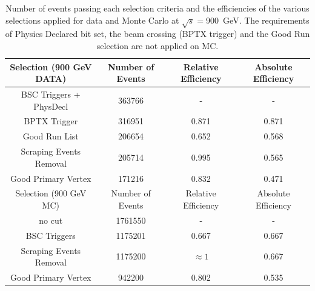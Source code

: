 \begin{table}[!ht]
  \begin{center}
    \begin{tabular}{|c|c|c|c|}
      \hline
      Selection (900 GeV DATA) & Number of Events  & Relative Efficiency & Absolute Efficiency\\
      \hline\hline
      BSC Triggers + PhysDecl  & 363766            & -                   & -      \\ 
      BPTX Trigger             & 316951		   & 0.871               & 0.871  \\
      Good Run List            & 206654		   & 0.652		 & 0.568  \\
      Scraping Events Removal  & 205714		   & 0.995		 & 0.565  \\
      Good Primary Vertex      & 171216		   & 0.832		 & 0.471  \\
      \hline
      \hline
      \hline
      \hline
      Selection (900 GeV MC)   & Number of Events  & Relative Efficiency & Absolute Efficiency\\
      \hline\hline
      no cut                   & 1761550           & -                   & -      \\ 
      BSC Triggers	       & 1175201	   & 0.667               & 0.667  \\ 
      Scraping Events Removal  & 1175200	   & $\approx 1$	 & 0.667  \\
      Good Primary Vertex      & 942200		   & 0.802		 & 0.535  \\
      \hline
  \end{tabular}
    \caption{Number of events passing each selection criteria and
      the efficiencies of the various selections applied for data and Monte Carlo at $\sqrt{s}=900$~GeV. 
      The requirements of Physics Declared bit set, the beam crossing (BPTX trigger) and the Good Run selection 
      are not applied on MC.}
    \label{tab:selectionefficiency_900}
  \end{center}
\end{table}


